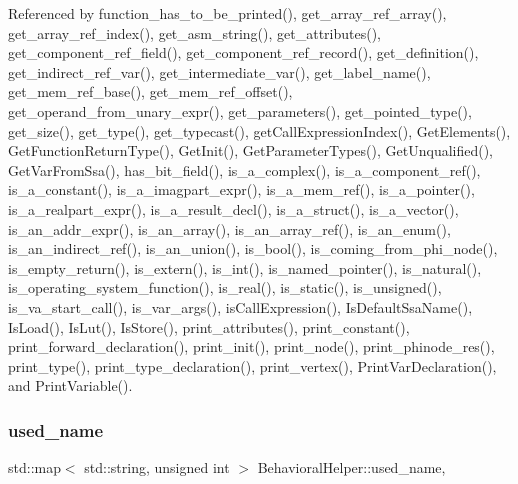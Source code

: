 Referenced by function\+\_\+has\+\_\+to\+\_\+be\+\_\+printed(), get\+\_\+array\+\_\+ref\+\_\+array(), get\+\_\+array\+\_\+ref\+\_\+index(), get\+\_\+asm\+\_\+string(), get\+\_\+attributes(), get\+\_\+component\+\_\+ref\+\_\+field(), get\+\_\+component\+\_\+ref\+\_\+record(), get\+\_\+definition(), get\+\_\+indirect\+\_\+ref\+\_\+var(), get\+\_\+intermediate\+\_\+var(), get\+\_\+label\+\_\+name(), get\+\_\+mem\+\_\+ref\+\_\+base(), get\+\_\+mem\+\_\+ref\+\_\+offset(), get\+\_\+operand\+\_\+from\+\_\+unary\+\_\+expr(), get\+\_\+parameters(), get\+\_\+pointed\+\_\+type(), get\+\_\+size(), get\+\_\+type(), get\+\_\+typecast(), get\+Call\+Expression\+Index(), Get\+Elements(), Get\+Function\+Return\+Type(), Get\+Init(), Get\+Parameter\+Types(), Get\+Unqualified(), Get\+Var\+From\+Ssa(), has\+\_\+bit\+\_\+field(), is\+\_\+a\+\_\+complex(), is\+\_\+a\+\_\+component\+\_\+ref(), is\+\_\+a\+\_\+constant(), is\+\_\+a\+\_\+imagpart\+\_\+expr(), is\+\_\+a\+\_\+mem\+\_\+ref(), is\+\_\+a\+\_\+pointer(), is\+\_\+a\+\_\+realpart\+\_\+expr(), is\+\_\+a\+\_\+result\+\_\+decl(), is\+\_\+a\+\_\+struct(), is\+\_\+a\+\_\+vector(), is\+\_\+an\+\_\+addr\+\_\+expr(), is\+\_\+an\+\_\+array(), is\+\_\+an\+\_\+array\+\_\+ref(), is\+\_\+an\+\_\+enum(), is\+\_\+an\+\_\+indirect\+\_\+ref(), is\+\_\+an\+\_\+union(), is\+\_\+bool(), is\+\_\+coming\+\_\+from\+\_\+phi\+\_\+node(), is\+\_\+empty\+\_\+return(), is\+\_\+extern(), is\+\_\+int(), is\+\_\+named\+\_\+pointer(), is\+\_\+natural(), is\+\_\+operating\+\_\+system\+\_\+function(), is\+\_\+real(), is\+\_\+static(), is\+\_\+unsigned(), is\+\_\+va\+\_\+start\+\_\+call(), is\+\_\+var\+\_\+args(), is\+Call\+Expression(), Is\+Default\+Ssa\+Name(), Is\+Load(), Is\+Lut(), Is\+Store(), print\+\_\+attributes(), print\+\_\+constant(), print\+\_\+forward\+\_\+declaration(), print\+\_\+init(), print\+\_\+node(), print\+\_\+phinode\+\_\+res(), print\+\_\+type(), print\+\_\+type\+\_\+declaration(), print\+\_\+vertex(), Print\+Var\+Declaration(), and Print\+Variable().

\mbox{\label{classBehavioralHelper_aad28b106f7c6e672da00f2530dd0b48c}} 
\subsubsection{\texorpdfstring{used\+\_\+name}{used\_name}}
{\footnotesize\ttfamily std\+::map$<$ std\+::string, unsigned int $>$ Behavioral\+Helper\+::used\+\_\+name\hspace{0.3cm}{\ttfamily [static]}, {\ttfamily [protected]}}



